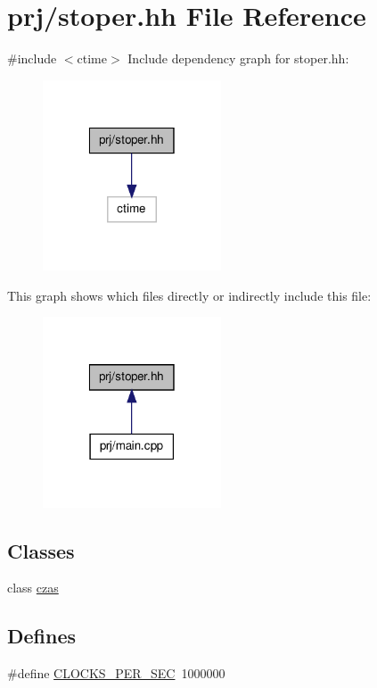 \hypertarget{stoper_8hh}{\section{prj/stoper.hh \-File \-Reference}
\label{stoper_8hh}
}
{\ttfamily \#include $<$ctime$>$}\*
\-Include dependency graph for stoper.\-hh\-:
\nopagebreak
\begin{figure}[H]
\begin{center}
\leavevmode
\includegraphics[width=150pt]{stoper_8hh__incl}
\end{center}
\end{figure}
\-This graph shows which files directly or indirectly include this file\-:
\nopagebreak
\begin{figure}[H]
\begin{center}
\leavevmode
\includegraphics[width=150pt]{stoper_8hh__dep__incl}
\end{center}
\end{figure}
\subsection*{\-Classes}
\begin{DoxyCompactItemize}
\item 
class \hyperlink{classczas}{czas}
\end{DoxyCompactItemize}
\subsection*{\-Defines}
\begin{DoxyCompactItemize}
\item 
\#define \hyperlink{stoper_8hh_a3d9fc3c745d0880902fe3ea3d5d5f71e}{\-C\-L\-O\-C\-K\-S\-\_\-\-P\-E\-R\-\_\-\-S\-E\-C}~1000000
\end{DoxyCompactItemize}



